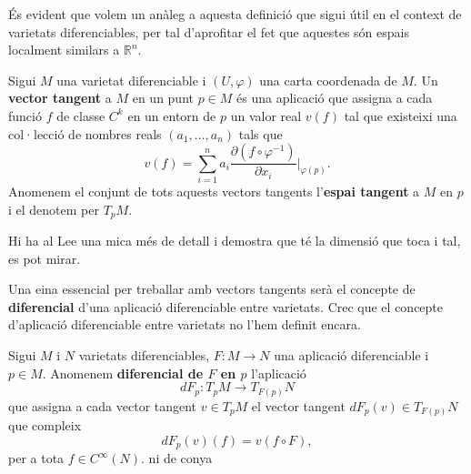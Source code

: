 És evident que volem un anàleg a aquesta definició que sigui útil en el context de varietats diferenciables, per tal d'aprofitar el fet que aquestes són espais localment similars a $\mathbb R^n$. 
\begin{defi}
    Sigui $M$ una varietat diferenciable i $(U,\varphi)$ una carta coordenada de $M$. Un \textbf{vector tangent} a $M$ en un punt $p\in M$ és una aplicació que assigna a cada funció $f$ de classe $C^k$ en un entorn de $p$ un valor real $v(f)$ tal que existeixi una col·lecció de nombres reals $(a_1,\dots,a_n)$ tals que
    \begin{equation*}
        v(f) = \sum_{i=1}^n a_i\frac{\partial (f\circ\varphi^{-1})}{\partial x_i}\Big|_{\varphi(p)}.
    \end{equation*}
    Anomenem el conjunt de tots aquests vectors tangents l'\textbf{espai tangent} a $M$ en $p$ i el denotem per $T_pM$.
\end{defi}
{\color{blue} Hi ha al Lee una mica més de detall i demostra que té la dimensió que toca i tal, es pot mirar.}

Una eina essencial per treballar amb vectors tangents serà el concepte de \textbf{diferencial} d'una aplicació diferenciable entre varietats.
{\color{blue} Crec que el concepte d'aplicació diferenciable entre varietats no l'hem definit encara.}
\begin{defi}
    Sigui $M$ i $N$ varietats diferenciables, $F:M\to N$ una aplicació diferenciable i $p\in M$. Anomenem \textbf{diferencial de $F$ en $p$} l'aplicació
    \begin{equation*}
        dF_p:T_pM\to T_{F(p)}N
    \end{equation*}
    que assigna a cada vector tangent $v\in T_pM$ el vector tangent $dF_p(v)\in T_{F(p)}N$ que compleix
    \begin{equation*}
        dF_p(v)(f) = v(f\circ F),
    \end{equation*}
    per a tota $f\in C^\infty(N)$.{\color{red} ni de conya}
\end{defi}




\newpage